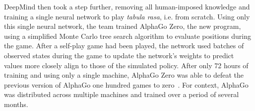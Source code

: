 DeepMind then took a step further,
removing all human-imposed knowledge and
training a single neural network to play \textit{tabula rasa}, i.e. from scratch.
%
Using only this single neural network,
the team trained AlphaGo Zero,
the new program,
using a simplified Monte Carlo tree search algorithm to evaluate positions
during the game.
%
After a self-play game had been played,
the network used batches of observed states during the game to update
the network's weights to predict values
more closely align to those of the simulated policy.
%
After only 72 hours of training and using only a single machine,
AlphaGo Zero was able to defeat the previous version of AlphaGo
one hundred games to zero~\cite{deepmind_alphago_zero}.
%
For context,
AlphaGo was distributed across multiple machines
and trained over a period of several months.

